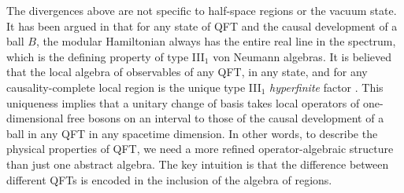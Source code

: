 \documentclass[a4paper,11pt]{article}
\theoremstyle{definition}
\begin{document}
The divergences above are not specific to half-space regions or the vacuum state. It has been argued in \cite{fredenhagen1985modular} that for any state of QFT and the causal development of a ball $B$, the modular Hamiltonian always has the entire real line in the spectrum, which is the defining property of type III$_1$ von Neumann algebras. It is believed that the local algebra of observables of any QFT, in any state, and for any causality-complete local region is the unique type III$_1$ {\it hyperfinite} factor \cite{buchholz1987universal}. This uniqueness implies that a unitary change of basis takes local operators of one-dimensional free bosons on an interval to those of the causal development of a ball in any QFT in any spacetime dimension. In other words, to describe the physical properties of  QFT, we need a more refined operator-algebraic structure than just one abstract algebra. The key intuition is that the difference between different QFTs is encoded in the inclusion of the algebra of regions. 
\end{document}
